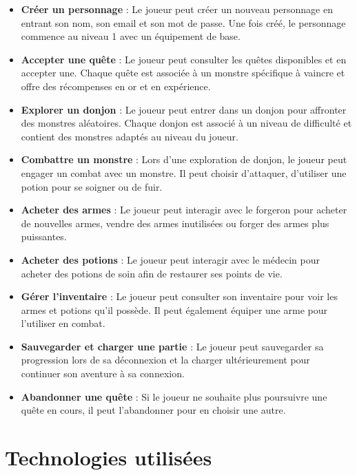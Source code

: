 \documentclass{article}
\begin{document}
\begin{itemize}
    \item \textbf{Créer un personnage} : Le joueur peut créer un nouveau personnage en entrant son nom, son email et son mot de passe. Une fois créé, le personnage commence au niveau 1 avec un équipement de base.

    \item \textbf{Accepter une quête} : Le joueur peut consulter les quêtes disponibles et en accepter une. Chaque quête est associée à un monstre spécifique à vaincre et offre des récompenses en or et en expérience.

    \item \textbf{Explorer un donjon} : Le joueur peut entrer dans un donjon pour affronter des monstres aléatoires. Chaque donjon est associé à un niveau de difficulté et contient des monstres adaptés au niveau du joueur.

    \item \textbf{Combattre un monstre} : Lors d'une exploration de donjon, le joueur peut engager un combat avec un monstre. Il peut choisir d'attaquer, d'utiliser une potion pour se soigner ou de fuir.

    \item \textbf{Acheter des armes} : Le joueur peut interagir avec le forgeron pour acheter de nouvelles armes, vendre des armes inutilisées ou forger des armes plus puissantes.

    \item \textbf{Acheter des potions} : Le joueur peut interagir avec le médecin pour acheter des potions de soin afin de restaurer ses points de vie.

    \item \textbf{Gérer l'inventaire} : Le joueur peut consulter son inventaire pour voir les armes et potions qu'il possède. Il peut également équiper une arme pour l'utiliser en combat.

    \item \textbf{Sauvegarder et charger une partie} : Le joueur peut sauvegarder sa progression lors de sa déconnexion et la charger ultérieurement pour continuer son aventure à sa connexion.

    \item \textbf{Abandonner une quête} : Si le joueur ne souhaite plus poursuivre une quête en cours, il peut l'abandonner pour en choisir une autre.
\end{itemize}


\section{Technologies utilisées}
\end{document}
